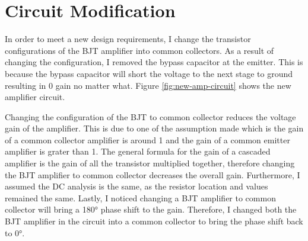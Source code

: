 \documentclass{article}
\begin{document}
\section{Circuit Modification}

In order to meet a new design requirements, I change the transistor configurations of the BJT amplifier into common collectors.
As a result of changing the configuration, I removed the bypass capacitor at the emitter.
This is because the bypass capacitor will short the voltage to the next stage to ground resulting in 0 gain no matter what.
Figure \ref{fig:new-amp-circuit} shows the new amplifier circuit.

Changing the configuration of the BJT to common collector reduces the voltage gain of the amplifier.
This is due to one of the assumption made which is the gain of a common collector amplifier is around 1 and the gain of a common emitter amplifier is grater than 1.
The general formula for the gain of a cascaded amplifier is the gain of all the transistor multiplied together, therefore changing the BJT amplifier to common collector decreases the overall gain.
Furthermore, I assumed the DC analysis is the same, as the resistor location and values remained the same.
Lastly, I noticed changing a BJT amplifier to common collector will bring a \ang{180} phase shift to the gain.
Therefore, I changed both the BJT amplifier in the circuit into a common collector to bring the phase shift back to \ang{0}.
\end{document}
